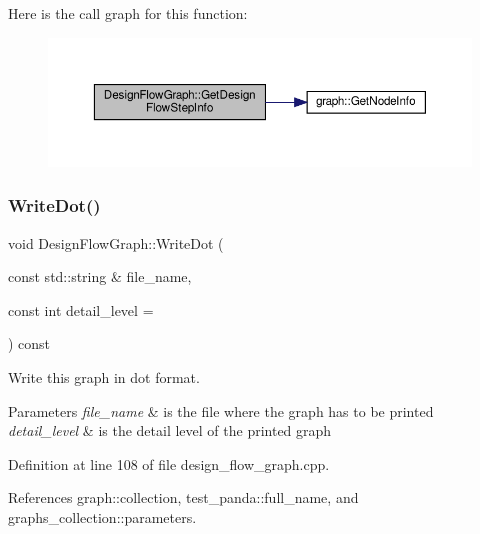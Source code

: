 Here is the call graph for this function\+:
\nopagebreak
\begin{figure}[H]
\begin{center}
\leavevmode
\includegraphics[width=350pt]{de/de0/classDesignFlowGraph_adb71a3b457e5865e877470562c3d2165_cgraph}
\end{center}
\end{figure}
\mbox{\label{classDesignFlowGraph_a41d86542c0c25d99e0c3f0bcd511859b}} 
\subsubsection{\texorpdfstring{Write\+Dot()}{WriteDot()}\hspace{0.1cm}{\footnotesize\ttfamily [1/2]}}
{\footnotesize\ttfamily void Design\+Flow\+Graph\+::\+Write\+Dot (\begin{DoxyParamCaption}\item[{const std\+::string \&}]{file\+\_\+name,  }\item[{const int}]{detail\+\_\+level = {} }\end{DoxyParamCaption}) const}



Write this graph in dot format. 


\begin{DoxyParams}{Parameters}
{\em file\+\_\+name} & is the file where the graph has to be printed \\
\hline
{\em detail\+\_\+level} & is the detail level of the printed graph \\
\hline
\end{DoxyParams}


Definition at line 108 of file design\+\_\+flow\+\_\+graph.\+cpp.



References graph\+::collection, test\+\_\+panda\+::full\+\_\+name, and graphs\+\_\+collection\+::parameters.

